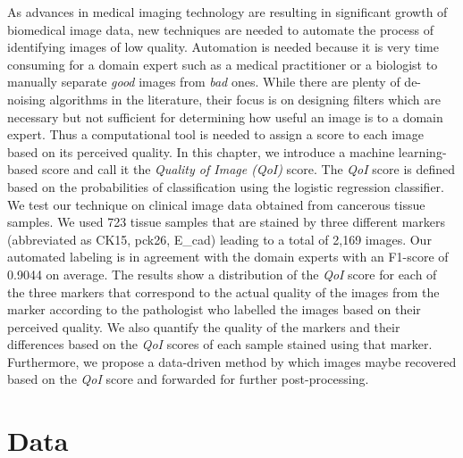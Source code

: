 As advances in medical imaging technology are resulting in significant growth of biomedical image data, new techniques are needed to automate the process of identifying images of low quality. Automation is needed because it is very time consuming for a domain expert such as a medical practitioner or a biologist to manually separate \textit{good} images from \textit{bad} ones. While there are plenty of de-noising algorithms in the literature, their focus is on designing filters which are necessary but not sufficient for determining how useful an image is to a domain expert.
Thus a computational tool is needed to assign a score to each image based on its perceived quality. In this chapter, we introduce a machine learning-based score and call it the \textit{Quality of Image (QoI)} score. The \textit{QoI} score is defined based on the probabilities of classification using the logistic regression classifier.
We test our technique on clinical image data obtained from cancerous tissue samples. We used 723 tissue samples that are stained by three different markers (abbreviated as CK15, pck26, E\_cad) leading to a total of 2,169 images. Our automated labeling is in agreement with the domain experts with an F1-score of 0.9044 on average. The results show a distribution of the \textit{QoI} score for each of the three markers that correspond to the actual quality of the images from the marker according to the pathologist who labelled the images based on their perceived quality.  We also quantify the quality of the markers and their differences based on the \textit{QoI} scores of each sample stained using that marker. 
Furthermore, we propose a data-driven method by which images maybe recovered based on the \textit{QoI} score and forwarded for further post-processing.

\section{Data}

